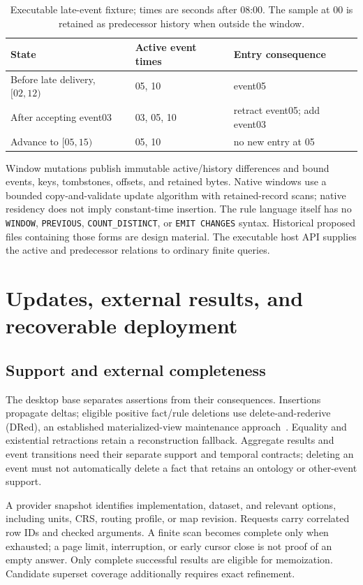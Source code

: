 \documentclass{article}
\newcommand{\code}[1]{\texttt{#1}}
\begin{document}
\begin{table}[t]
\centering\small
\caption{Executable late-event fixture; times are seconds after 08:00.
The sample at 00 is retained as predecessor history when outside the window.}
\label{tab:entry}
\begin{tabularx}{\linewidth}{lYY}
\toprule
State & Active event times & Entry consequence \\
\midrule
Before late delivery, $[02,12)$ & 05, 10 & event05 \\
After accepting event03 & 03, 05, 10 & retract event05; add event03 \\
Advance to $[05,15)$ & 05, 10 & no new entry at 05 \\
\bottomrule
\end{tabularx}
\end{table}

Window mutations publish immutable active/history differences and bound events,
keys, tombstones, offsets, and retained bytes. Native windows use a bounded
copy-and-validate update algorithm with retained-record scans; native residency
does not imply constant-time insertion. The rule language itself has no
\code{WINDOW}, \code{PREVIOUS}, \code{COUNT\_DISTINCT}, or \code{EMIT CHANGES}
syntax. Historical proposed files containing those forms are design material.
The executable host API supplies the active and predecessor relations to
ordinary finite queries.

\section{Updates, external results, and recoverable deployment}
\subsection{Support and external completeness}
The desktop base separates assertions from their consequences. Insertions
propagate deltas; eligible positive fact/rule deletions use delete-and-rederive
(DRed), an established materialized-view maintenance approach~\cite{gupta1993}.
Equality and existential retractions retain a reconstruction fallback. Aggregate
results and event transitions need their separate support and temporal contracts;
deleting an event must not automatically delete a fact that retains an ontology
or other-event support.

A provider snapshot identifies implementation, dataset, and relevant options,
including units, CRS, routing profile, or map revision. Requests carry correlated
row IDs and checked arguments. A finite scan becomes complete only when exhausted;
a page limit, interruption, or early cursor close is not proof of an empty
answer. Only complete successful results are eligible for memoization. Candidate
superset coverage additionally requires exact refinement.
\end{document}
